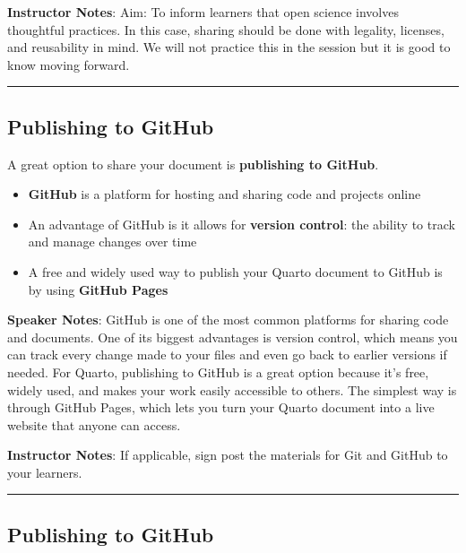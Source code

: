 \documentclass[
  letterpaper,
  DIV=11,
  numbers=noendperiod]{scrartcl}
\providecommand{\tightlist}{%
  \setlength{\itemsep}{0pt}\setlength{\parskip}{0pt}}
\begin{document}
\textbf{Instructor Notes}: Aim: To inform learners that open science
involves thoughtful practices. In this case, sharing should be done with
legality, licenses, and reusability in mind. We will not practice this
in the session but it is good to know moving forward.

\begin{center}\rule{0.5\linewidth}{0.5pt}\end{center}

\subsection{Publishing to GitHub}\label{publishing-to-github}

A great option to share your document is \textbf{publishing to GitHub}.

\begin{itemize}
\tightlist
\item
  \textbf{GitHub} is a platform for hosting and sharing code and
  projects online
\item
  An advantage of GitHub is it allows for \textbf{version control}: the
  ability to track and manage changes over time
\item
  A free and widely used way to publish your Quarto document to GitHub
  is by using \textbf{GitHub Pages}
\end{itemize}

\textbf{Speaker Notes}: GitHub is one of the most common platforms for
sharing code and documents. One of its biggest advantages is version
control, which means you can track every change made to your files and
even go back to earlier versions if needed. For Quarto, publishing to
GitHub is a great option because it's free, widely used, and makes your
work easily accessible to others. The simplest way is through GitHub
Pages, which lets you turn your Quarto document into a live website that
anyone can access.

\textbf{Instructor Notes}: If applicable, sign post the materials for
Git and GitHub to your learners.

\begin{center}\rule{0.5\linewidth}{0.5pt}\end{center}

\subsection{Publishing to GitHub}\label{publishing-to-github-1}
\end{document}
